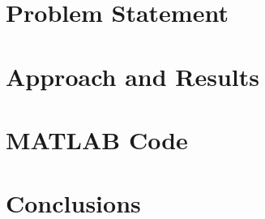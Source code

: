  
\usepackage{listings}
\usepackage[normalem]{ulem}
\lstset{
  numbers=left,
  language=Python,
  showstringspaces=false
}


\maketitle %

\section{Problem Statement} 


\section{Approach and Results} 

\section{MATLAB Code} 

\section{Conclusions} 

